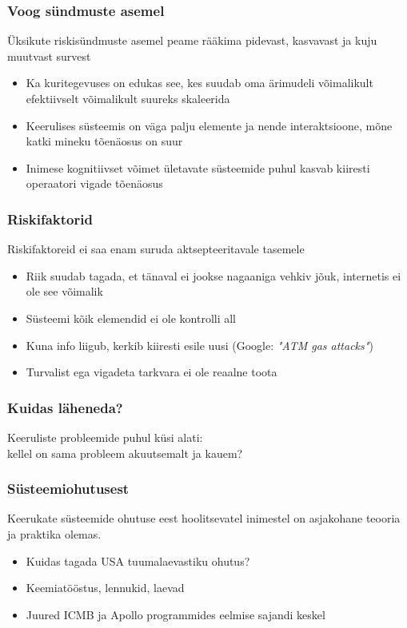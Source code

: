 \begin{frame}[fragile]
  \frametitle{Voog sündmuste asemel}
	Üksikute riskisündmuste asemel peame rääkima pidevast, kasvavast ja kuju muutvast survest
	\begin{itemize}
		\item Ka kuritegevuses on edukas see, kes suudab oma ärimudeli võimalikult efektiivselt võimalikult suureks skaleerida
		\item Keerulises süsteemis on väga palju elemente ja nende interaktsioone, mõne katki mineku tõenäosus on suur
		\item Inimese kognitiivset võimet ületavate süsteemide puhul kasvab kiiresti operaatori vigade tõenäosus
	\end{itemize}
\end{frame}

\begin{frame}[fragile]
  \frametitle{Riskifaktorid}
	Riskifaktoreid ei saa enam suruda aktsepteeritavale tasemele
	\begin{itemize}
		\item Riik suudab tagada, et tänaval ei jookse nagaaniga vehkiv jõuk, internetis ei ole see võimalik
		\item Süsteemi kõik elemendid ei ole kontrolli all
		\item Kuna info liigub, kerkib kiiresti esile uusi (Google: \emph{"ATM gas attacks"})
		\item Turvalist ega vigadeta tarkvara ei ole reaalne toota
	\end{itemize}
\end{frame}

\fi

\begin{frame}[fragile]
	\frametitle{Kuidas läheneda?}
	\vfill
	\begin{center}
		Keeruliste probleemide puhul küsi alati: \\kellel on sama probleem akuutsemalt ja kauem?  
	\end{center}
	\vfill
\end{frame}

\begin{frame}[fragile]
  \frametitle{Süsteemiohutusest}
	Keerukate süsteemide ohutuse eest hoolitsevatel inimestel on asjakohane teooria ja praktika olemas.
	\begin{itemize}
		\item Kuidas tagada USA tuumalaevastiku ohutus?
		\item Keemiatööstus, lennukid, laevad 
		\item Juured ICMB ja Apollo programmides eelmise sajandi keskel
	\end{itemize}
\end{frame}

